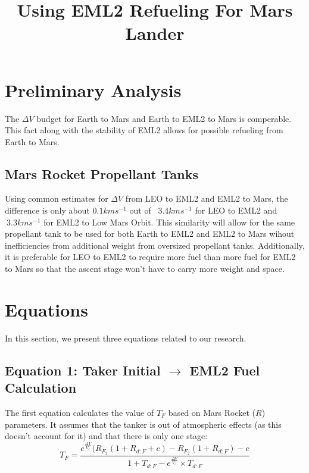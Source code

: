 \documentclass[10pt,a4paper, twocolumn]{article}
\title{Using EML2 Refueling For Mars Lander}
\begin{document}
\maketitle

\fontsize{10}{14}\selectfont
\section{Preliminary Analysis}
The $\Delta V$ budget for Earth to Mars and Earth to EML2 to Mars is comperable. This fact along with the stability of EML2 allows for possible refueling from Earth to Mars. \\

\subsection{Mars Rocket Propellant Tanks}

\noindent Using common estimates for $\Delta V$ from LEO to EML2 and EML2 to Mars, the difference is only about $0.1kms^{-1}$ out of ~$3.4kms^{-1}$ for LEO to EML2 and $~3.3kms^{-1}$ for EML2 to Low Mars Orbit. This similarity will allow for the same propellant tank to be used for both Earth to EML2 and EML2 to Mars wihout inefficiencies from additional weight from oversized propellant tanks. Additionally, it is preferable for LEO to EML2 to require more fuel than more fuel for EML2 to Mars so that the ascent stage won't have to carry more weight and space. \\


\section{Equations}
In this section, we present three equations related to our research.

\subsection{Equation 1: Taker Initial $\rightarrow$ EML2 Fuel Calculation}
The first equation calculates the value of $T_F$ based on Mars Rocket ($R$) parameters. It assumes that the tanker is out of atmospheric effects (as this doesn't account for it) and that there is only one stage: \\

$$T_F=\frac{e^{\frac{\Delta V}{V_e}}(R_{F_2}(1+R_{d:F}+c)-R_{F_2}(1+R_{d:F})-c}{1+T_{d:F}-e^{\frac{\Delta V}{V_e}}\times T_{d:F}}$$ \\
\end{document}
